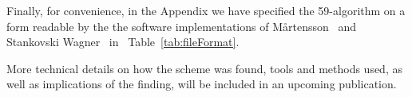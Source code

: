 \documentclass{article}
\newcommand{\tabref}[1]{Table~\ref{tab:#1}}
\begin{document}
Finally, for convenience, in the Appendix we have specified the 59-algorithm on a form readable by the the software implementations of Mårtensson~\cite{github-erik} and Stankovski Wagner~\cite{github-paul} in ~\tabref{fileFormat}.

More technical details on how the scheme was found, tools and methods used, as well as implications of the finding, will be included in an upcoming publication.

\end{document}
